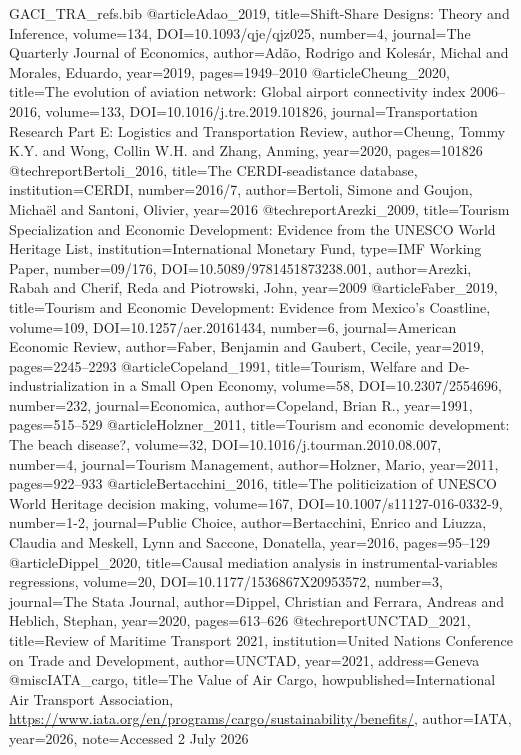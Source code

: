 \begin{filecontents*}[overwrite]{GACI_TRA_refs.bib}
@article{Adao_2019, title={Shift-Share Designs: Theory and Inference}, volume={134}, DOI={10.1093/qje/qjz025}, number={4}, journal={The Quarterly Journal of Economics}, author={Ad\~ao, Rodrigo and Koles\'ar, Michal and Morales, Eduardo}, year={2019}, pages={1949--2010} }
@article{Cheung_2020, title={The evolution of aviation network: Global airport connectivity index 2006--2016}, volume={133}, DOI={10.1016/j.tre.2019.101826}, journal={Transportation Research Part E: Logistics and Transportation Review}, author={Cheung, Tommy K.Y. and Wong, Collin W.H. and Zhang, Anming}, year={2020}, pages={101826} }
@techreport{Bertoli_2016, title={The {CERDI}-seadistance database}, institution={CERDI}, number={2016/7}, author={Bertoli, Simone and Goujon, Micha\"el and Santoni, Olivier}, year={2016} }
@techreport{Arezki_2009, title={Tourism Specialization and Economic Development: Evidence from the {UNESCO} World Heritage List}, institution={International Monetary Fund}, type={IMF Working Paper}, number={09/176}, DOI={10.5089/9781451873238.001}, author={Arezki, Rabah and Cherif, Reda and Piotrowski, John}, year={2009} }
@article{Faber_2019, title={Tourism and Economic Development: Evidence from Mexico's Coastline}, volume={109}, DOI={10.1257/aer.20161434}, number={6}, journal={American Economic Review}, author={Faber, Benjamin and Gaubert, Cecile}, year={2019}, pages={2245--2293} }
@article{Copeland_1991, title={Tourism, Welfare and De-industrialization in a Small Open Economy}, volume={58}, DOI={10.2307/2554696}, number={232}, journal={Economica}, author={Copeland, Brian R.}, year={1991}, pages={515--529} }
@article{Holzner_2011, title={Tourism and economic development: The beach disease?}, volume={32}, DOI={10.1016/j.tourman.2010.08.007}, number={4}, journal={Tourism Management}, author={Holzner, Mario}, year={2011}, pages={922--933} }
@article{Bertacchini_2016, title={The politicization of {UNESCO} World Heritage decision making}, volume={167}, DOI={10.1007/s11127-016-0332-9}, number={1-2}, journal={Public Choice}, author={Bertacchini, Enrico and Liuzza, Claudia and Meskell, Lynn and Saccone, Donatella}, year={2016}, pages={95--129} }
@article{Dippel_2020, title={Causal mediation analysis in instrumental-variables regressions}, volume={20}, DOI={10.1177/1536867X20953572}, number={3}, journal={The Stata Journal}, author={Dippel, Christian and Ferrara, Andreas and Heblich, Stephan}, year={2020}, pages={613--626} }
@techreport{UNCTAD_2021, title={Review of Maritime Transport 2021}, institution={United Nations Conference on Trade and Development}, author={{UNCTAD}}, year={2021}, address={Geneva} }
@misc{IATA_cargo, title={The Value of Air Cargo}, howpublished={International Air Transport Association, \url{https://www.iata.org/en/programs/cargo/sustainability/benefits/}}, author={{IATA}}, year={2026}, note={Accessed 2 July 2026} }
\end{filecontents*}

